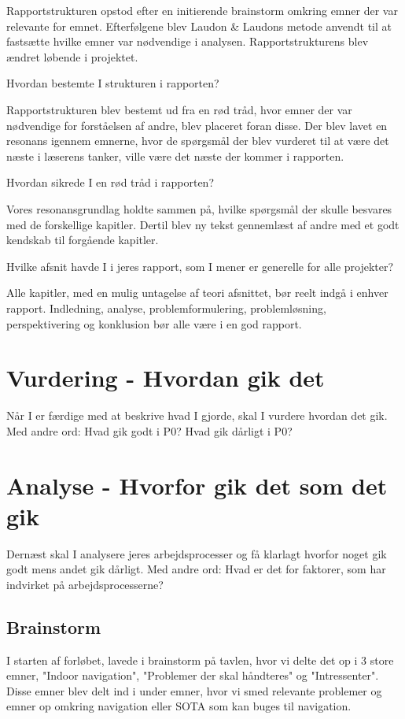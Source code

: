 \documentclass[a4paper,12pt,twoside,openright]{memoir}
\begin{document}
        Rapportstrukturen opstod efter en initierende brainstorm omkring emner der var relevante for emnet. Efterfølgene blev Laudon & Laudons metode anvendt til at fastsætte hvilke emner var nødvendige i analysen. Rapportstrukturens blev ændret løbende i projektet.

        Hvordan bestemte I strukturen i rapporten?

        Rapportstrukturen blev bestemt ud fra en rød tråd, hvor emner der var nødvendige for forståelsen af andre, blev placeret foran disse. Der blev lavet en resonans igennem emnerne, hvor de spørgsmål der blev vurderet til at være det næste i læserens tanker, ville være det næste der kommer i rapporten.

        Hvordan sikrede I en rød tråd i rapporten?

        Vores resonansgrundlag holdte sammen på, hvilke spørgsmål der skulle besvares med de forskellige kapitler. Dertil blev ny tekst gennemlæst af andre med et godt kendskab til forgående kapitler.

        Hvilke afsnit havde I i jeres rapport, som I mener er generelle for alle projekter?

        Alle kapitler, med en mulig untagelse af teori afsnittet, bør reelt indgå i enhver rapport. Indledning, analyse, problemformulering, problemløsning, perspektivering og konklusion bør alle være i en god rapport.

    \section{Vurdering - Hvordan gik det}
    Når I er færdige med at beskrive hvad I gjorde, skal I vurdere hvordan det gik. Med andre ord: Hvad gik godt i P0? Hvad gik dårligt i P0? 

    \section{Analyse - Hvorfor gik det som det gik}
    Dernæst skal I analysere jeres arbejdsprocesser og få klarlagt hvorfor noget gik godt mens andet gik dårligt. Med andre ord: Hvad er det for faktorer, som har indvirket på arbejdsprocesserne? 

        \subsection{Brainstorm}
        I starten af forløbet, lavede i brainstorm på tavlen, hvor vi delte det op i 3 store  emner, "Indoor navigation", "Problemer der skal håndteres" og "Intressenter". Disse emner blev delt ind i under emner, hvor vi smed relevante problemer og emner op omkring navigation eller SOTA som kan buges til navigation. 
\end{document}
